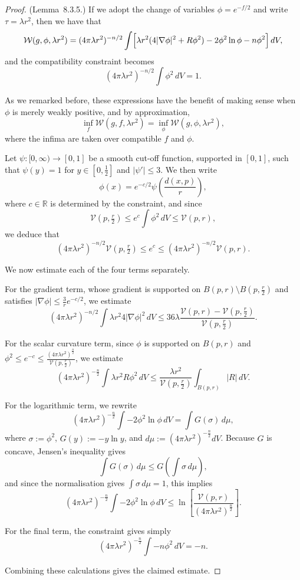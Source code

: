 \begin{proof}
(Lemma~8.3.5.) If we adopt the change of variables $\phi = e^{-f/2}$ and write
$\tau = \lambda r^2$, then we have that
\[
\mathcal W(g,\phi,\lambda r^2)
= (4\pi \lambda r^2)^{-n/2}
\int \Bigl[\lambda r^2(4|\nabla \phi|^2 + R\phi^2) - 2\phi^2 \ln \phi - n\phi^2\Bigr]\,dV,
\]
and the compatibility constraint becomes
\[
(4\pi \lambda r^2)^{-n/2}\int \phi^2\,dV = 1.
\]

As we remarked before, these expressions have the benefit of making sense when
$\phi$ is merely weakly positive, and by approximation,
\[
\inf_f \mathcal W(g,f,\lambda r^2)
= \inf_\phi \mathcal W(g,\phi,\lambda r^2),
\]
where the infima are taken over compatible $f$ and $\phi$.

Let $\psi : [0,\infty) \to [0,1]$ be a smooth cut-off function, supported in
$[0,1]$, such that $\psi(y)=1$ for $y \in [0,\tfrac12]$ and $|\psi'| \le 3$.
We then write
\[
\phi(x) = e^{-c/2}\psi\!\left(\frac{d(x,p)}{r}\right),
\]
where $c \in \mathbb R$ is determined by the constraint, and since
\[
\mathcal V(p,\tfrac r2) \le e^c \int \phi^2\,dV \le \mathcal V(p,r),
\]
we deduce that
\[
(4\pi \lambda r^2)^{-n/2}\mathcal V(p,\tfrac r2)
\le e^c \le
(4\pi \lambda r^2)^{-n/2}\mathcal V(p,r).
\]

We now estimate each of the four terms separately.

For the gradient term, whose gradient is supported on $B(p,r)\setminus
B(p,\tfrac r2)$ and satisfies $|\nabla \phi|\le \frac{3}{r}e^{-c/2}$, we
estimate
\[
(4\pi \lambda r^2)^{-n/2}
\int \lambda r^2 4|\nabla \phi|^2\,dV
\le 36\lambda \frac{\mathcal V(p,r)-\mathcal V(p,\tfrac r2)}{\mathcal V(p,\tfrac r2)}.
\]

For the scalar curvature term, since $\phi$ is supported on $B(p,r)$ and
$\phi^2 \le e^{-c} \le \frac{(4\pi \lambda r^2)^{\frac{n}{2}}}{\mathcal V(p,\frac{r}{2})}$, we estimate
\[
(4\pi \lambda r^2)^{-\frac{n}{2}} \int \lambda r^2 R \phi^2\,dV \le \frac{\lambda r^2}{\mathcal V(p,\frac{r}{2})} \int_{B(p,r)} |R|\,dV.
\]

For the logarithmic term, we rewrite
\[
(4\pi \lambda r^2)^{-\frac{n}{2}} \int -2\phi^2 \ln \phi\,dV = \int G(\sigma)\,d\mu,
\]
where $\sigma := \phi^2$, $G(y) := -y\ln y$, and $d\mu := (4\pi \lambda r^2)^{-\frac n2}dV$.
Because $G$ is concave, Jensen's inequality gives
\[
\int G(\sigma)\,d\mu \le G\!\left(\int \sigma\,d\mu\right),
\]
and since the normalisation gives $\int \sigma\,d\mu = 1$, this implies
\[
(4\pi \lambda r^2)^{-\frac{n}{2}} \int -2\phi^2 \ln \phi\,dV \le \ln\!\left[\frac{\mathcal V(p,r)}{(4\pi \lambda r^2)^{\frac{n}{2}}}\right].
\]

For the final term, the constraint gives simply
\[
(4\pi \lambda r^2)^{-\frac{n}{2}} \int -n\phi^2\,dV = -n.
\]

Combining these calculations gives the claimed estimate.
\end{proof}

